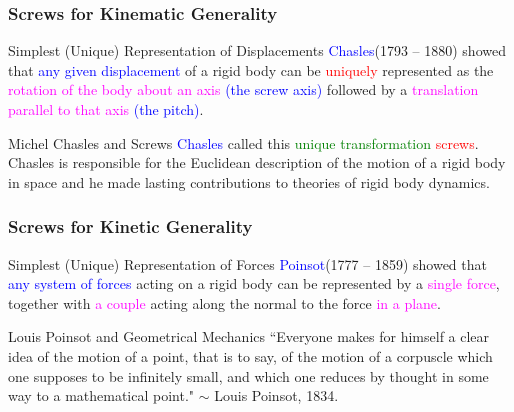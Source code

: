 \begin{frame}
	\frametitle{Screws for Kinematic Generality}
	\begin{block}{Simplest (Unique) Representation of Displacements}
		\textcolor{blue}{Chasles}(1793 – 1880) showed that \textcolor{blue}{any given displacement} of a rigid body can be \textcolor{red}{uniquely} represented as the \textcolor{magenta}{rotation of the body about an axis} \textcolor{blue}{(the screw axis)} followed by a \textcolor{magenta}{translation parallel to that axis} \textcolor{blue}{(the pitch)}.
	\end{block}
	\begin{block}{Michel Chasles and Screws}
		\textcolor{blue}{Chasles} called this  \textcolor{green}{unique transformation}  \textcolor{red}{screws}.  Chasles is responsible for the Euclidean description of the motion of a rigid body in space and he made lasting contributions to theories of rigid body dynamics.
	\end{block}
\end{frame}

\begin{frame}
	\frametitle{Screws for Kinetic Generality}
	\begin{block}{Simplest (Unique) Representation of Forces}
		\textcolor{blue}{Poinsot}(1777 – 1859) showed that \textcolor{blue}{any system of forces} acting on a rigid body can be  represented by a \textcolor{magenta}{single force}, together with \textcolor{magenta}{a couple} acting along the normal to the force \textcolor{magenta}{in a plane}.
	\end{block}
	\begin{block}{Louis Poinsot and Geometrical Mechanics}
		``Everyone makes for himself a clear idea of the motion of a point, that is to say, of the motion of a corpuscle which one supposes to be infinitely small, and which one reduces by thought in some way to a mathematical point." $\sim$ Louis Poinsot, 1834.
	\end{block}
\end{frame}



